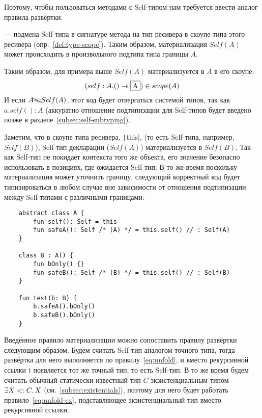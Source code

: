 Поэтому, чтобы пользоваться методами с Self-типом нам требуется ввести аналог правила развёртки.

\begin{definition}
    \label{def:materialization}
     --- подмена Self-типа в сигнатуре метода на тип ресивера в скоупе типа этого ресивера (опр.~\ref{def:type-scope}).
    Таким образом, материализация $Self(A)$ может происходить в произвольного подтипа типа границы $A$.
\end{definition}

Таким образом, для примера выше $Self(A)$ материализуется в $A$ в его скоупе:
\[(self: A.() \to \framebox{A}) \in scope(A)\]
И если $A \bcancel{<:} Self(A)$, этот код будет отвергаться системой типов, так как $a.self() : A$ (аккуратно отношение подтипизации для Self-типов будет введено позже в разделе~\ref{subsec:self-subtyping}).

Заметим, что в скоупе типа ресивера, \texttt|this|, (то есть Self-типа, например, $Self(B)$), Self-тип декларации ($Self(A)$) материализуется в $Self(B)$.
Так как Self-тип не покидает контекста того же объекта, его значение безопасно использовать в позициях, где ожидается Self-тип.
В то же время поскольку материализация может уточнить границу, следующий корректный код будет типизироваться в любом случае вне зависимости от отношения подтипизации между Self-типами с различными границами:

\begin{verbatim}
    abstract class A {
        fun self(): Self = this
        fun safeA(): Self /* (A) */ = this.self() // : Self(A)
    }

    class B : A() {
        fun bOnly() {}
        fun safeB(): Self /* (B) */ = this.self() // : Self(B)
    }

    fun test(b: B) {
        b.safeA().bOnly()
        b.safeB().bOnly()
    }
\end{verbatim}

Введённое правило материализации можно сопоставить правилу развёртки следующим образом.
Будем считать Self-тип аналогом точного типа, тогда развёртка для него выполняется по правилу~\eqref{eq:unfold}, и вместо рекурсивной ссылки $t$ появляется тот же точный тип, то есть Self-тип.
В то же время будем считать обычный статически известный тип $C$ экзистенциальным типом $\exists X <: C \ldotp X$ (см.~\ref{subsec:existentials}), поэтому для него будет работать правило~\eqref{eq:unfold-ex}, подставляющее экзистенциальный тип вместо рекурсивной ссылки.

